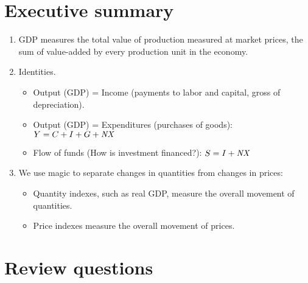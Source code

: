\section*{Executive summary}

\begin{enumerate}
\item GDP measures the total value of production measured at market prices,
the sum of value-added by every production unit in the economy.

\item Identities.

   \begin{itemize}

   \item Output (GDP) = Income (payments to labor and capital,
   gross of depreciation).

   \item Output (GDP) = Expenditures (purchases of goods):  $Y = C+I+G+\mbox{\em NX\/}$

   \item Flow of funds (How is investment financed?):  $S =I + \mbox{\em NX\/}$

   \end{itemize}

\item We use magic to separate changes in quantities from changes in prices:
\begin{itemize}
\item Quantity indexes, such as real GDP, measure the overall movement of quantities.
\item Price indexes measure the overall movement of prices.
\end{itemize}

\end{enumerate}


\section*{Review questions}

